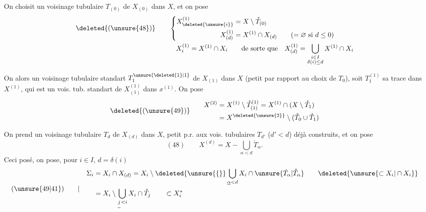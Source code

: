 On choisit un voisinage tubulaire  $T_{(0)}$ de
$X_{(0)}$ dans $X$, et on pose
\[
\begin{aligned}
\deleted{(\unsure{48})}\qquad&
\left\{\begin{aligned}
X^{(1)}_{\deleted{\unsure{i}}}&=X\setminus\mathring T_{(0)}\\
X^{(1)}_{(d)}&=X^{(1)}\cap X_{(d)}\qquad(=\varnothing\text{ si }d\leq0)
\end{aligned}\right.\\
&\quad X^{(1)}_i=X^{(1)}\cap X_i
\qquad\text{de sorte que}\quad
X^{(1)}_{(d)}=\bigcup_{\substack{i\in I\\\delta(i)\leq d}}X^{(1)}\cap X_i
\end{aligned}
\]

On  alors un voisinage tubulaire
standart  $T_1^{\unsure{\deleted{1}|1}}$ de $X_{(1)}$ dans $X$
(petit par rapport au choix de $T_0$), soit $T_1^{(1)}$ sa trace dans
$X^{(1)}$, qui est un vois. tub. standart de $X^{(1)}_{(1)}$ dans
$x^{(1)}$. On pose
\[
\deleted{(\unsure{49})}\qquad
\begin{aligned}
X^{(2)}&=X^{(1)}\setminus\mathring T^{(1)}_{(1)}
=X^{(1)}\cap(X\setminus\mathring T_1)\\
&=X^{\deleted{\unsure{2}}}\setminus(\mathring T_0\cup\mathring T_1)
\end{aligned}
\]

On prend un voisinage tubulaire $T_d$ de $X_{(d)}$ dans $X$,
petit p.r. aux vois. tubulaires $T_{d'}$ ($d'<d$) déjà construits,
et on pose
\[
(48)\qquad X^{(d)}=X-\bigcup_{\alpha<d}\mathring T_\alpha.
\]
Ceci posé, on pose, pour $i\in I$, $d=\delta(i)$
\[
(\unsure{49|41})\qquad|\quad
\begin{aligned}
\Sigma_i&=X_i\cap X_{(d)}
=X_i\setminus\deleted{\unsure{\{}}\bigcup_{\underline{\alpha}<d}X_i\cap
\unsure{\dot T_\alpha|\mathring T_\alpha}
\qquad\deleted{\unsure{\subset X_i|\cap X_i}}\\
&=X_i\setminus\bigcup_{\underset{\sim}{j}<i}X_i\cap\mathring T_j
\qquad\subset X_i^*
\end{aligned}
\]

